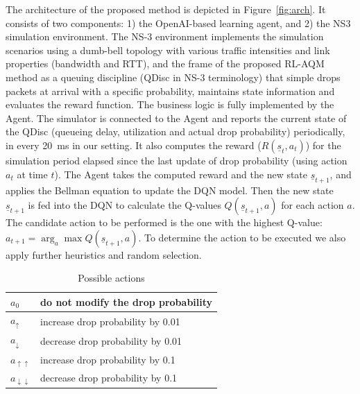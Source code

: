 \documentclass[conference]{IEEEtran}
\begin{document}
The architecture of the proposed method is depicted in Figure~\ref{fig:arch}. It consists of two components: 1) the OpenAI-based learning agent, and 2) the NS3 simulation environment. The NS-3 environment implements the simulation scenarios using a dumb-bell topology with various traffic intensities and link properties (bandwidth and RTT), and the frame of the proposed RL-AQM method as a queuing discipline (QDisc in NS-3 terminology) that simple drops packets at arrival with a specific probability, maintains state information and evaluates the reward function. The business logic is fully implemented by the Agent. The simulator is connected to the Agent and reports the current state of the QDisc (queueing delay, utilization and actual drop probability) periodically, in every 20~ms in our setting. It also computes the reward ($R(\underline{s}_t,a_t)$) for the simulation period elapsed since the last update of drop probability (using action $a_t$ at time $t$). The Agent takes the computed reward and the new state $\underline{s}_{t+1}$, and applies the Bellman equation to update the DQN model. Then the new state $\underline{s}_{t+1}$ is fed into the DQN to calculate the Q-values $Q(\underline{s}_{t+1},a)$ for each action $a$. The candidate action to be performed is the one with the highest Q-value: $a_{t+1} = \arg_a\max Q(\underline{s}_{t+1},a)$. To determine the action to be executed we also apply further heuristics and random selection. 

\begin{table}[ht]
\centering
\label{tab:actions}
\caption{Possible actions}
\begin{tabular}{ | m{2em} | m{14em} |  }
\hline
$a_{0}$  & do not modify the drop probability \\ 
\hline
$a_{\uparrow}$ & increase drop probability by 0.01 \\ 
\hline
$a_{\downarrow}$ & decrease drop probability by 0.01 \\
\hline
$a_{\uparrow\uparrow}$ & increase drop probability by 0.1 \\
\hline
$a_{\downarrow\downarrow}$ & decrease drop probability by 0.1 \\
\hline
\end{tabular}
\end {table}
\end{document}
